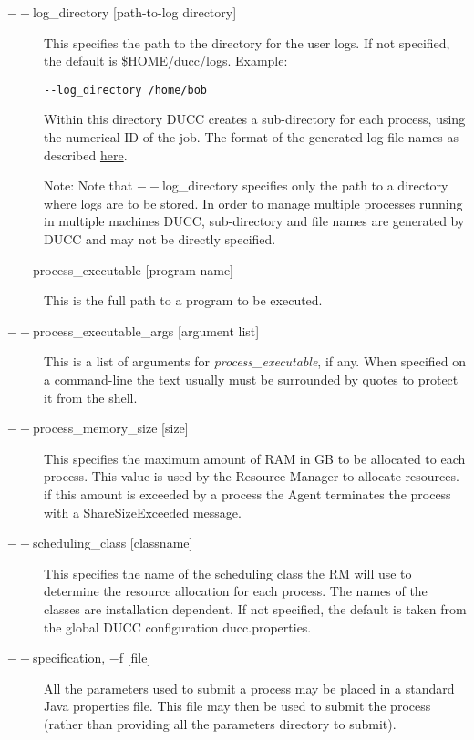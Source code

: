 \begin{description}
        \item[$--$log\_directory {[path-to-log directory]} ]

          This specifies the path to the directory for the user logs. If not specified, the default
          is \$HOME/ducc/logs. Example: 
\begin{verbatim}
--log_directory /home/bob 
\end{verbatim}
          
          Within this directory DUCC creates a sub-directory for each process, using the numerical 
          ID of the job. The format of the generated log file names as described
          \hyperref[chap:job-logs]{here}.
          
          Note: Note that $--$log\_directory specifies only the path to a directory where 
          logs are to be stored. In order to manage multiple processes running in multiple 
          machines DUCC, sub-directory and file names are generated by DUCC and may 
          not be directly specified. 

        \item[$--$process\_executable {[program name]}] This is the full path to a program to be
          executed.

        \item[$--$process\_executable\_args {[argument list]}] This is a list of arguments for
          {\em process\_executable}, if any.   When specified on a command-line the text usually must be
          surrounded by quotes to protect it from the shell.

        \item[$--$process\_memory\_size {[size]} ] This specifies the maximum amount of RAM in GB to
          be allocated to each process.  This value is used by the Resource Manager to allocate
          resources. if this amount is exceeded by a process the Agent terminates the process with a
          ShareSizeExceeded message.

        \item[$--$scheduling\_class {[classname]} ] This specifies the name of the scheduling class the
          RM will use to determine the resource allocation for each process. The names of the
          classes are installation dependent. If not specified, the default is taken from the global
          DUCC configuration ducc.properties.

        \item[$--$specification, $-$f {[file]} ] All the parameters used to submit a process may be placed
          in a standard Java properties file.  This file may then be used to submit the process
          (rather than providing all the parameters directory to submit).
          

\end{description}
